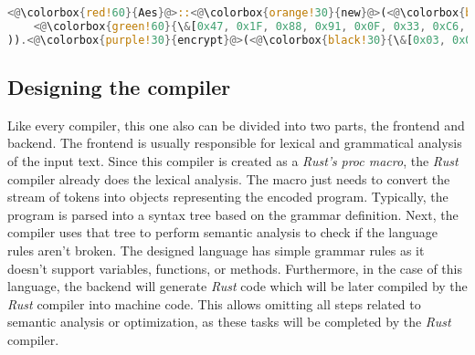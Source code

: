 \begin{minipage}{\linewidth}
\begin{lstlisting}[language=rust,caption={Example of interpreted test case.},label={tcdecoded}]
<@\colorbox{red!60}{Aes}@>::<@\colorbox{orange!30}{new}@>(<@\colorbox{blue!30}{Key::new}@>(
    <@\colorbox{green!60}{\&[0x47, 0x1F, 0x88, 0x91, 0x0F, 0x33, 0xC6, 0x28]}@>
)).<@\colorbox{purple!30}{encrypt}@>(<@\colorbox{black!30}{\&[0x03, 0x0F, 0x74, 0x4D, 0xBA, 0x32, 0x0D, 0xFF]}@>, <@\colorbox{yellow!60}{AesMode::CBC}@>)
\end{lstlisting}
\end{minipage}


\subsection{Designing the compiler} \label{sec:compiler}
Like every compiler, this one also can be divided into two parts, the frontend and backend. The frontend is usually responsible for lexical and grammatical analysis of the input text. Since this compiler is created as a \textit{Rust's} \textit{proc macro}, the \textit{Rust} compiler already does the lexical analysis. The macro just needs to convert the stream of tokens into objects representing the encoded program. Typically, the program is parsed into a syntax tree based on the grammar definition. Next, the compiler uses that tree to perform semantic analysis to check if the language rules aren't broken. The designed language has simple grammar rules as it doesn't support variables, functions, or methods. Furthermore, in the case of this language, the backend will generate \textit{Rust} code which will be later compiled by the \textit{Rust} compiler into machine code. This allows omitting all steps related to semantic analysis or optimization, as these tasks will be completed by the \textit{Rust} compiler. 

